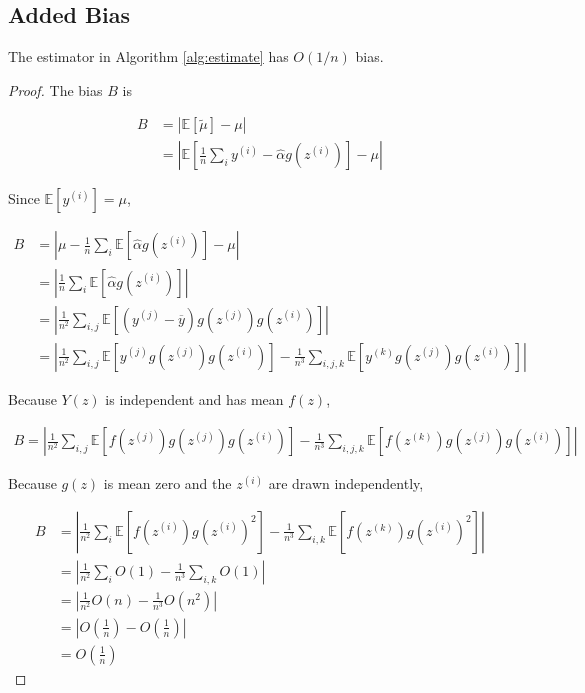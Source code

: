 \subsection{Added Bias}

\begin{prop}[\ref{prop:added_bias}]
The estimator in Algorithm \ref{alg:estimate} has $O(1/n)$ bias.
\end{prop}
\begin{proof}

The bias $B$ is

\begin{align}
B &= \left| \mathbb{E}[\widetilde{\mu}] - \mu \right| \\
&= \left| \mathbb{E}[\frac{1}{n} \sum_i y^{(i)} - \hat{\alpha} g(z^{(i)})] - \mu \right|
\end{align}

Since $\mathbb{E}[y^{(i)}] = \mu$,

\begin{align}
B&= \left| \mu - \frac{1}{n} \sum_i \mathbb{E}[\hat{\alpha} g(z^{(i)})] - \mu \right| \\
&=\left| \frac{1}{n} \sum_i \mathbb{E}[\hat{\alpha} g(z^{(i)})] \right| \\
&=\left| \frac{1}{n^2} \sum_{i,j} \mathbb{E}[(y^{(j)} - \overline{y}) g(z^{(j)}) g(z^{(i)})]\right| \\
&=\left| \frac{1}{n^2} \sum_{i,j} \mathbb{E}[y^{(j)} g(z^{(j)}) g(z^{(i)})] - \frac{1}{n^3} \sum_{i,j,k} \mathbb{E}[y^{(k)} g(z^{(j)}) g(z^{(i)})] \right| 
\end{align}

Because $Y(z)$ is independent and has mean $f(z)$,

\begin{align}
B=\left| \frac{1}{n^2} \sum_{i,j} \mathbb{E}[f(z^{(j)}) g(z^{(j)}) g(z^{(i)})] - \frac{1}{n^3} \sum_{i,j,k} \mathbb{E}[f(z^{(k)}) g(z^{(j)}) g(z^{(i)})] \right| 
\end{align}

Because $g(z)$ is mean zero and the $z^{(i)}$ are drawn independently,

\begin{align}
B &= \left| \frac{1}{n^2} \sum_{i} \mathbb{E}[f(z^{(i)}) g(z^{(i)})^2] - \frac{1}{n^3} \sum_{i,k} \mathbb{E}[f(z^{(k)}) g(z^{(i)})^2] \right| \\
&= \left| \frac{1}{n^2} \sum_{i} O(1) - \frac{1}{n^3} \sum_{i,k} O(1) \right| \\
&= \left| \frac{1}{n^2} O(n) - \frac{1}{n^3} O(n^2) \right| \\
&= \left| O \left(\frac{1}{n} \right) - O \left(\frac{1}{n} \right) \right| \\
&= O \left(\frac{1}{n} \right) 
\end{align}


\end{proof}
